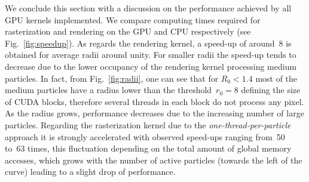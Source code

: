 \documentclass[preprint,5pt]{elsarticle}
\begin{document}
We conclude this section with a discussion on the performance achieved by all GPU kernels implemented. 
We compare computing times required for rasterization and rendering on the 
GPU and CPU respectively (see Fig.~\ref{fig:speedup}). 
As regards the rendering kernel, a speed-up of around~8 is obtained for average radii around unity. For smaller radii the speed-up
tends to decrease due to the lower occupancy of the rendering kernel processing medium particles.
In fact, from Fig.~\ref{fig:radii}, one can see that for $R_0<1.4$ most of the medium particles have a radius lower than the threshold~$r_0=8$ defining the size of CUDA blocks, therefore several threads in each block do not process any pixel.
As the radius grows, performance decreases due to the increasing number of large particles.
Regarding the rasterization kernel due to the {\it one-thread-per-particle} approach it is strongly accelerated with observed speed-ups ranging from~50 to~63 times, this fluctuation depending on the total amount of global memory accesses, which grows with the number of active particles (towards the left of the curve) leading to a slight drop of performance. 
\end{document}
